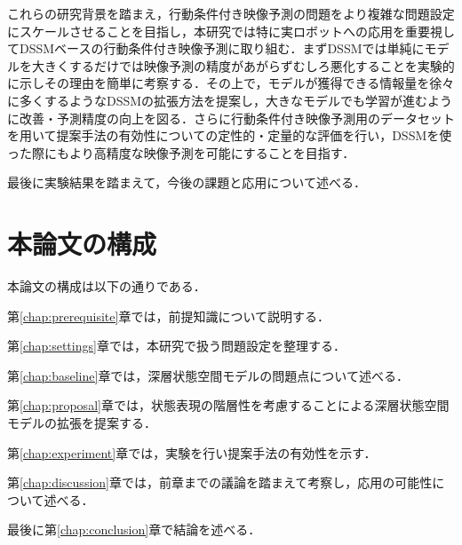 これらの研究背景を踏まえ，行動条件付き映像予測の問題をより複雑な問題設定にスケールさせることを目指し，本研究では特に実ロボットへの応用を重要視してDSSMベースの行動条件付き映像予測に取り組む．まずDSSMでは単純にモデルを大きくするだけでは映像予測の精度があがらずむしろ悪化することを実験的に示しその理由を簡単に考察する．その上で，モデルが獲得できる情報量を徐々に多くするようなDSSMの拡張方法を提案し，大きなモデルでも学習が進むように改善・予測精度の向上を図る．さらに行動条件付き映像予測用のデータセットを用いて提案手法の有効性についての定性的・定量的な評価を行い，DSSMを使った際にもより高精度な映像予測を可能にすることを目指す．

最後に実験結果を踏まえて，今後の課題と応用について述べる．

\section{本論文の構成}

本論文の構成は以下の通りである．

第\ref{chap:prerequisite}章では，前提知識について説明する．

第\ref{chap:settings}章では，本研究で扱う問題設定を整理する．

第\ref{chap:baseline}章では，深層状態空間モデルの問題点について述べる．

第\ref{chap:proposal}章では，状態表現の階層性を考慮することによる深層状態空間モデルの拡張を提案する．

第\ref{chap:experiment}章では，実験を行い提案手法の有効性を示す．

第\ref{chap:discussion}章では，前章までの議論を踏まえて考察し，応用の可能性について述べる．

最後に第\ref{chap:conclusion}章で結論を述べる．